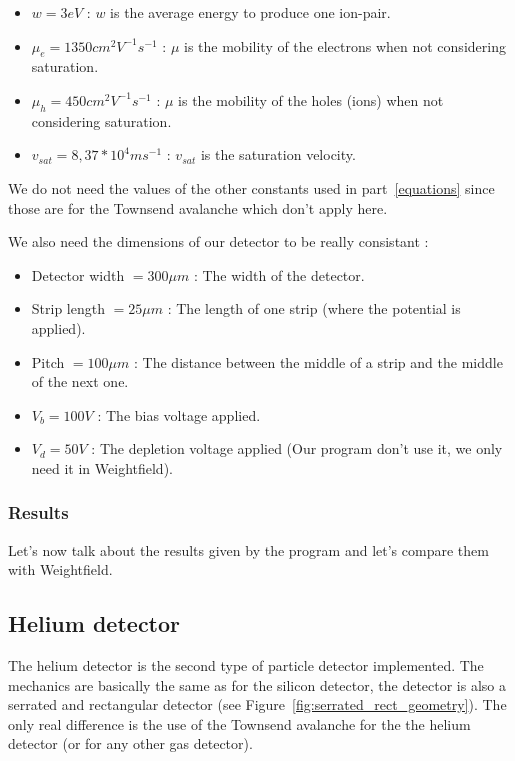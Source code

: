 \documentclass[11pt]{article}
\begin{document}
			\begin{itemize}

				\item $w = 3 eV$ : $w$ is the average energy to produce one ion-pair.
				\item $\mu_e = 1350 cm^2V^{-1}s^{-1}$ : $\mu$ is the mobility of the electrons
					when not considering saturation.
				\item $\mu_h = 450 cm^2V^{-1}s^{-1}$ : $\mu$ is the mobility of the holes (ions)
					when not considering saturation.
				\item $v_{sat} = 8,37*10^{4} ms^{-1}$ : $v_{sat}$ is the saturation velocity.

			\end{itemize}

			We do not need the values of the other constants used in part~\ref{equations} since
			those are for the Townsend avalanche which don't apply here.

			We also need the dimensions of our detector to be really consistant :

			\begin{itemize}

				\item Detector width $= 300 \mu m$ : The width of the detector.
				\item Strip length $= 25 \mu m$ : The length of one strip (where the potential is
					applied).
				\item Pitch $= 100 \mu m$ : The distance between the middle of a strip and the middle
					of the next one.
				\item $V_b = 100 V$ : The bias voltage applied.
				\item $V_d = 50 V$ : The depletion voltage applied (Our program don't use it, we only
					need it in Weightfield).

			\end{itemize}

		\subsubsection*{Results}

			Let's now talk about the results given by the program and let's compare them with Weightfield.

	\subsection{Helium detector}

		The helium detector is the second type of particle detector implemented. The mechanics are basically
		the same as for the silicon detector, the detector is also a serrated and rectangular detector
		(see Figure~\ref{fig:serrated_rect_geometry}). The only real difference is the use of the Townsend
		avalanche for the the helium detector (or for any other gas detector).
\end{document}
